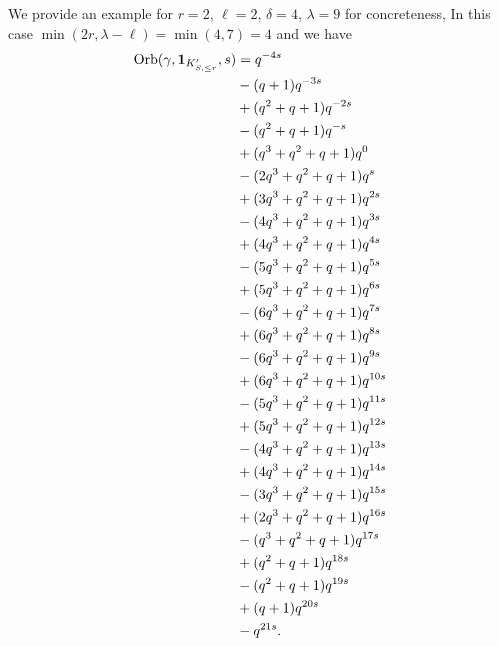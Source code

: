 \begin{example}
  We provide an example for $r=2$, $\ell=2$, $\delta=4$, $\lambda=9$ for concreteness,
  In this case $\min(2r, \lambda - \ell) = \min(4, 7) = 4$ and we have
  \begin{align*}
    \operatorname{Orb}(\gamma, \mathbf{1}_{K'_{S, \le r}}, s)
    &= q^{-4s} \\
    &- (q+1) q^{-3s} \\
    &+ (q^2+q+1) q^{-2s} \\
    &- (q^2+q+1) q^{-s} \\
    &+ (q^3+q^2+q+1) q^{0} \\
    &- (2q^3+q^2+q+1) q^{s} \\
    &+ (3q^3+q^2+q+1) q^{2s} \\
    &- (4q^3+q^2+q+1) q^{3s} \\
    &+ (4q^3+q^2+q+1) q^{4s} \\
    &- (5q^3+q^2+q+1) q^{5s} \\
    &+ (5q^3+q^2+q+1) q^{6s} \\
    &- (6q^3+q^2+q+1) q^{7s} \\
    &+ (6q^3+q^2+q+1) q^{8s} \\
    &- (6q^3+q^2+q+1) q^{9s} \\
    &+ (6q^3+q^2+q+1) q^{10s} \\
    &- (5q^3+q^2+q+1) q^{11s} \\
    &+ (5q^3+q^2+q+1) q^{12s} \\
    &- (4q^3+q^2+q+1) q^{13s} \\
    &+ (4q^3+q^2+q+1) q^{14s} \\
    &- (3q^3+q^2+q+1) q^{15s} \\
    &+ (2q^3+q^2+q+1) q^{16s} \\
    &- (q^3+q^2+q+1) q^{17s} \\
    &+ (q^2+q+1) q^{18s} \\
    &- (q^2+q+1) q^{19s} \\
    &+ (q+1) q^{20s} \\
    &- q^{21s}.
  \end{align*}
\end{example}

